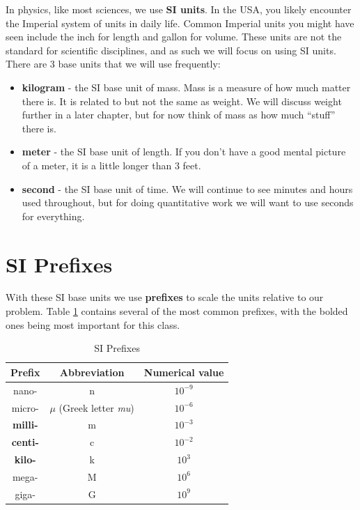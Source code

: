 \documentclass[12pt]{book}
\begin{document}
In physics, like most sciences, we use \textbf{SI units}. In the USA, you likely encounter the Imperial system of units in daily life. Common Imperial units you might have seen include the inch for length and gallon for volume. These units are not the standard for scientific disciplines, and as such we will focus on using SI units. There are 3 base units that we will use frequently:

\begin{itemize}
\item \textbf{kilogram} - the SI base unit of mass. Mass is a measure of how much matter there is. It is related to but not the same as weight. We will discuss weight further in a later chapter, but for now think of mass as how much ``stuff'' there is.

\item \textbf{meter} - the SI base unit of length. If you don't have a good mental picture of a meter, it is a little longer than 3 feet.

\item \textbf{second} - the SI base unit of time. We will continue to see minutes and hours used throughout, but for doing quantitative work we will want to use seconds for everything.
\end{itemize}

\section{SI Prefixes}

With these SI base units we use \textbf{prefixes} to scale the units relative to our problem. Table \ref{SIPrefixes} contains several of the most common prefixes, with the bolded ones being most important for this class.

\begin{table}[b]
\large
\centering
\caption{SI Prefixes}
\begin{tabular}{ c | c | c }
	\hline
	Prefix & Abbreviation & Numerical value \\
	\hline
	nano- & n & $10^{-9}$ \\
	micro- & $\mu$ (Greek letter \textit{mu}) & $10^{-6}$ \\
	\textbf{milli-} & m & $10^{-3}$ \\
	\textbf{centi-} & c & $10^{-2}$ \\
	\textbf{kilo-} & k & $10^3$ \\
	mega- & M & $10^6$ \\
	giga- & G & $10^9$ \\
	\hline
\end{tabular}

\label{SIPrefixes}
\end{table}
\end{document}
